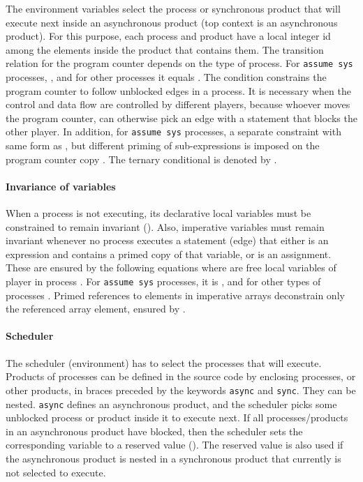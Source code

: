 \documentclass[copyright]{eptcs}
\begin{document}
The environment variables  select the process or synchronous product that will execute next inside an asynchronous product (top context is an asynchronous product).
For this purpose, each process and product have a local integer id  among the elements inside the product that contains them.
The transition relation for the program counter depends on the type of process.
For \texttt{assume sys} processes,
, and for other processes it equals .
The condition  constrains the program counter to follow unblocked edges in a process.
It is necessary when the control and data flow are controlled by different players, because whoever moves the program counter, can otherwise pick an edge with a statement that blocks the other player.
In addition, for \texttt{assume sys} processes, a separate constraint with same form as , but different priming of sub-expressions is imposed on the program counter copy .
The ternary conditional is denoted by .


\paragraph{Invariance of variables}

When a process is not executing, its declarative local variables must be constrained to remain invariant ().
Also, imperative variables must remain invariant whenever no process executes a statement (edge) that either is an expression and contains a primed copy of that variable, or is an assignment.
These are ensured by the following equations
where  are free local variables of player  in process .
For \texttt{assume sys} processes, it is
, and for other types of processes
.
Primed references to elements in imperative arrays deconstrain only the referenced array element, ensured by .


\paragraph{Scheduler}

The scheduler (environment) has to select the processes that will execute.
Products of processes can be defined in the source code by enclosing processes, or other products, in braces preceded by the keywords \texttt{async} and \texttt{sync}.
They can be nested.
\texttt{async} defines an asynchronous product, and the scheduler picks some unblocked process or product inside it to execute next.
If all processes/products in an asynchronous product  have blocked, then the scheduler sets the corresponding variable  to a reserved value ().
The reserved value is also used if the asynchronous product is nested in a synchronous product that currently is not selected to execute.
\end{document}

